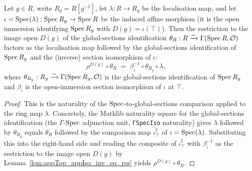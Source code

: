 \begin{lemma}\leanok
  \label{lem:key_morph}
  Let \(g \in R\), write \(R_g = R[g^{-1}]\), let \(\lambda : R \to R_g\) be the localisation map, and let
  \(\iota = \operatorname{Spec}(\lambda) : \operatorname{Spec} R_g \to \operatorname{Spec} R\) be the induced affine morphism (it is the open
  immersion identifying \(\operatorname{Spec} R_g\) with \(D(g) = \iota(\top)\)). Then the restriction to the image
  open \(D(g)\) of the global-sections identification
  \(\theta_R : R \xrightarrow{\sim} \Gamma(\operatorname{Spec} R, \mathcal{O})\) factors as the localisation map
  followed by the global-sections identification of \(\operatorname{Spec} R_g\) and the (inverse) section isomorphism
  of \(\iota\):
  \[
    \rho^{D(g)} \circ \theta_R
    \;=\;
    \beta_\iota^{-1} \circ \theta_{R_g} \circ \lambda,
  \]
  where \(\theta_{R_g} : R_g \xrightarrow{\sim} \Gamma(\operatorname{Spec} R_g, \mathcal{O})\) is the global-sections
  identification of \(\operatorname{Spec} R_g\) and \(\beta_\iota\) is the open-immersion section isomorphism of
  \(\iota\) at \(\top\).
\end{lemma}
\begin{proof}
  \leanok
  This is the naturality of the \(\operatorname{Spec}\)-to-global-sections comparison applied to the ring map
  \(\lambda\). Concretely, the Mathlib naturality square for the global-sections identification (the
  \(\Gamma\)-\(\operatorname{Spec}\) adjunction unit, \texttt{ΓSpecIso} naturality) gives
  \(\lambda \) followed by \(\theta_{R_g}\) equals \(\theta_R\) followed by the comparison map
  \(\iota^{\sharp}_{\top}\) of \(\iota = \operatorname{Spec}(\lambda)\). Substituting this into the right-hand side and
  reading the composite of \(\iota^{\sharp}_{\top}\) with \(\beta_\iota^{-1}\) as the restriction to the
  image open \(D(g)\) by Lemma~\ref{lem:appTop_appIso_inv_eq_res} yields \(\rho^{D(g)} \circ \theta_R\).
\end{proof}

